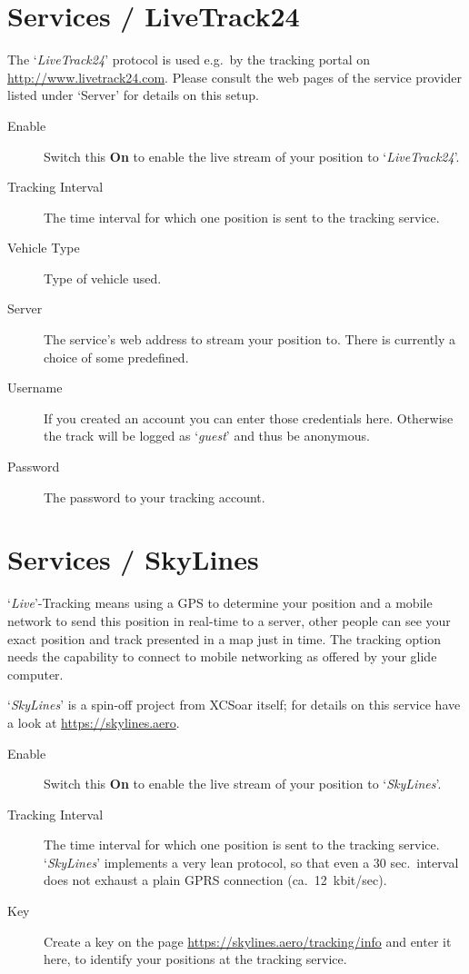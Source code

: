 \section{Services / LiveTrack24}

The `{\em LiveTrack24}' protocol is used e.g.\ by the tracking portal on
\url{http://www.livetrack24.com}.
Please consult the web pages of the service provider listed under `Server'
for details on this setup.

\begin{description}
\item[Enable]  Switch this {\bf On} to enable the live stream of 
  your position to `{\em LiveTrack24}'.
\item[Tracking Interval]  The time interval for which one position is sent to
  the tracking service.
\item[Vehicle Type]  Type of vehicle used.
\item[Server]  The service's web address to stream your position to. There is currently 
  a choice of some predefined.
\item[Username]  If you created an account you can enter those credentials here. 
  Otherwise the track will be logged as `{\it guest}' and thus be anonymous.  
\item[Password]  The password to your tracking account.
\end{description}


\section{Services / SkyLines}

`{\it Live}'-Tracking means using a GPS to determine your position and a mobile 
network to send this position in real-time to a server, other people can see 
your exact position and track presented in a map just in time.
The tracking option needs the capability to connect to mobile networking as offered by 
your glide computer.

`{\em SkyLines}' is a spin-off project from XCSoar itself; for details on this
service have a look at \url{https://skylines.aero}.

\begin{description}
\item[Enable]  Switch this {\bf On} to enable the live stream of 
  your position to `{\em SkyLines}'.
\item[Tracking Interval]  The time interval for which one position is sent to
  the tracking service. `{\em SkyLines}' implements a very lean protocol, so that even
  a 30 sec.\ interval does not exhaust a plain GPRS connection (ca.\ 12~kbit/sec).
\item[Key]  Create a key on the page \url{https://skylines.aero/tracking/info} 
  and enter it here, to identify your positions at the tracking service.
\end{description}


